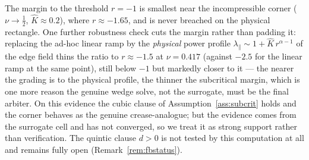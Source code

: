 The margin to the threshold $r=-1$ is smallest near the incompressible corner ($\nu\to\tfrac12$, $\hat K\approx0.2$),
where $r\approx-1.65$, and is never breached on the physical rectangle. One further robustness check cuts the margin
rather than padding it: replacing the ad-hoc linear ramp by the \emph{physical} power profile
$\lambda_\parallel\sim1+\hat K\,r^{\alpha-1}$ of the edge field thins the ratio to $r\approx-1.5$ at
$\nu=0.417$ (against $-2.5$ for the linear ramp at the same point), still below $-1$ but markedly closer to it ---
the nearer the grading is to the physical profile, the thinner the subcritical margin, which is one more reason the
genuine wedge solve, not the surrogate, must be the final arbiter. On this evidence the cubic clause of
Assumption~\ref{ass:subcrit} holds and the corner behaves as the genuine crease-analogue; but the evidence comes
from the surrogate cell and has not converged, so we treat it as strong support rather than verification. The
quintic clause $d>0$ is not tested by this computation at all and remains fully open (Remark~\ref{rem:fbstatus}).

